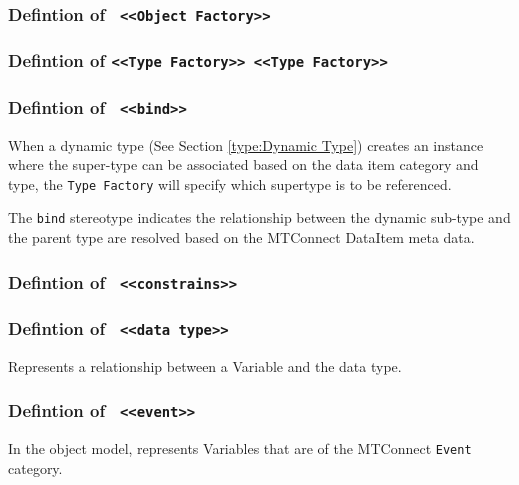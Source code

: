 \FloatBarrier
\subsubsection{Defintion of \texttt{ <<Object Factory>>}}
  \label{type:Object Factory}

\FloatBarrier
\FloatBarrier
\subsubsection{Defintion of \texttt{<<Type Factory>> <<Type Factory>>}}
  \label{type:Type Factory}

\FloatBarrier
\FloatBarrier
\subsubsection{Defintion of \texttt{ <<bind>>}}
  \label{type:bind}

\FloatBarrier

When a dynamic type (See Section \ref{type:Dynamic Type}) creates an instance where the super-type
can be associated based on the data item category and type, the \texttt{Type Factory} will 
specify which supertype is to be referenced.

The \texttt{bind} stereotype indicates the relationship between the dynamic sub-type and the 
parent type are resolved based on the MTConnect DataItem meta data.

\FloatBarrier
\subsubsection{Defintion of \texttt{ <<constrains>>}}
  \label{type:constrains}

\FloatBarrier
\FloatBarrier
\subsubsection{Defintion of \texttt{ <<data type>>}}
  \label{type:data type}

\FloatBarrier

Represents a relationship between a Variable and the data type.

\FloatBarrier
\subsubsection{Defintion of \texttt{ <<event>>}}
  \label{type:event}

\FloatBarrier

In the object model, represents Variables that are of the MTConnect \texttt{Event} category.

